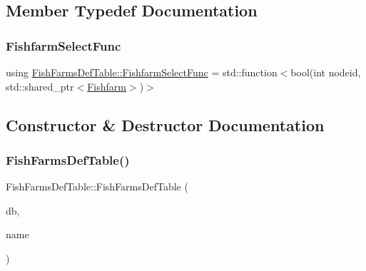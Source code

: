 \subsection{Member Typedef Documentation}
\mbox{\label{class_fish_farms_def_table_aeab850ebda904be43b0b690c789a56b9}} 
\subsubsection{\texorpdfstring{FishfarmSelectFunc}{FishfarmSelectFunc}}
{\footnotesize\ttfamily using \mbox{\hyperlink{class_fish_farms_def_table_aeab850ebda904be43b0b690c789a56b9}{Fish\+Farms\+Def\+Table\+::\+Fishfarm\+Select\+Func}} =  std\+::function$<$bool(int nodeid, std\+::shared\+\_\+ptr$<$\mbox{\hyperlink{class_fishfarm}{Fishfarm}}$>$)$>$}



\subsection{Constructor \& Destructor Documentation}
\mbox{\label{class_fish_farms_def_table_a9f2b076ad975bd67f5d4c2ba5823afbd}} 
\subsubsection{\texorpdfstring{FishFarmsDefTable()}{FishFarmsDefTable()}}
{\footnotesize\ttfamily Fish\+Farms\+Def\+Table\+::\+Fish\+Farms\+Def\+Table (\begin{DoxyParamCaption}\item[{std\+::shared\+\_\+ptr$<$ sqlite\+::\+S\+Q\+Lite\+Storage $>$}]{db,  }\item[{std\+::string}]{name }\end{DoxyParamCaption})}

\mbox{\label{class_fish_farms_def_table_a5e5b452ede20a89727a7b8f498928c1d}} 
